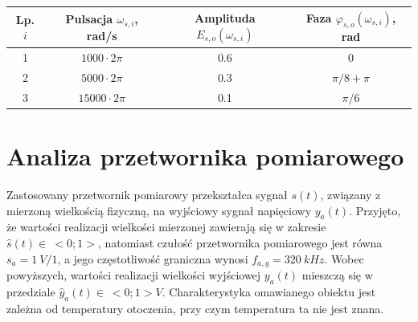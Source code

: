 \begin{table}[htb!]
\begin{center}
\begin{tabular}[c]{| c | c | c | c |} \hline
\textbf{Lp. $i$} & \textbf{Pulsacja $\omega_{s,i}$, rad/s} & \textbf{Amplituda $E_{s,o}(\omega_{s,i})$} & \textbf{Faza $\varphi_{s,o}(\omega_{s,i})$, rad} \\ \hline
1 & $1000  \cdot 2\pi$ &  \num{0.6} & $0$           \\ \hline
2 & $5000  \cdot 2\pi$ &  \num{0.3} & $\pi/8 + \pi$ \\ \hline
3 & $15000 \cdot 2\pi$ &  \num{0.1} & $\pi/6$       \\ \hline
\end{tabular}
\end{center}
\end{table}

\section{Analiza przetwornika pomiarowego}

Zastosowany przetwornik pomiarowy przekształca sygnał $s(t)$, związany z mierzoną wielkością fizyczną, na wyjściowy sygnał napięciowy $y_{a}(t)$. Przyjęto, że wartości realizacji wielkości mierzonej zawierają się w zakresie $\hat{s}(t) \in~<0;1>$, natomiast czułość przetwornika pomiarowego jest równa $s_{a} = \qty{1}{V \per 1}$, a jego częstotliwość graniczna wynosi $f_{a,g} = \qty{320}{kHz}$. Wobec powyższych, wartości realizacji wielkości wyjściowej $y_{a}(t)$ mieszczą się w przedziale $\hat{y}_{a}(t) \in~<0;1>\unit{V}$. Charakterystyka omawianego obiektu jest zależna od temperatury otoczenia, przy czym temperatura ta nie jest znana.

